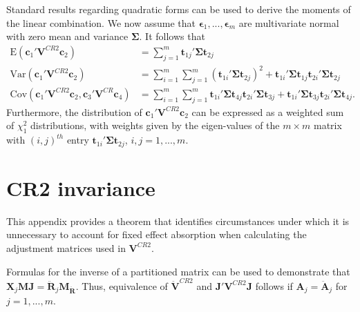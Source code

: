 \documentclass[12pt]{article}\usepackage[]{graphicx}\usepackage[]{color}
\newcommand{\E}{\text{E}}
\newcommand{\Cov}{\text{Cov}}
\newcommand{\Var}{\text{Var}}
\newcommand{\bm}{\mathbf}
\newcommand{\bs}{\boldsymbol}
\begin{document}
Standard results regarding quadratic forms can be used to derive the moments of the linear combination. We now assume that $\bs\epsilon_1,...,\bs\epsilon_m$ are multivariate normal with zero mean and variance $\bs\Sigma$. It follows that 
\begin{align}
\label{eq:CRVE_expectation}
\E\left(\bm{c}_1' \bm{V}^{CR2} \bm{c}_2\right) &= \sum_{j=1}^m \bm{t}_{1j}' \bs\Sigma \bm{t}_{2j} \\
\label{eq:CRVE_variance}
\Var\left(\bm{c}_1' \bm{V}^{CR2} \bm{c}_2\right) &= \sum_{i=1}^m \sum_{j=1}^m \left(\bm{t}_{1i}' \bs\Sigma \bm{t}_{2j}\right)^2 + \bm{t}_{1i}' \bs\Sigma \bm{t}_{1j} \bm{t}_{2i}' \bs\Sigma \bm{t}_{2j} \\
\label{eq:CRVE_covariance}
\Cov\left(\bm{c}_1' \bm{V}^{CR2} \bm{c}_2, \bm{c}_3' \bm{V}^{CR} \bm{c}_4\right) &= \sum_{i=1}^m \sum_{j=1}^m \bm{t}_{1i}' \bs\Sigma \bm{t}_{4j} \bm{t}_{2i}' \bs\Sigma \bm{t}_{3j} + \bm{t}_{1i}' \bs\Sigma \bm{t}_{3j} \bm{t}_{2i}' \bs\Sigma \bm{t}_{4j}.
\end{align}
Furthermore, the distribution of $\bm{c}_1' \bm{V}^{CR2} \bm{c}_2$ can be expressed as a weighted sum of $\chi^2_1$ distributions, with weights given by the eigen-values of the $m \times m$ matrix with $\left(i,j\right)^{th}$ entry $\bm{t}_{1i}' \bs\Sigma \bm{t}_{2j}$, $i,j=1,...,m$.


\section{CR2 invariance}
\label{app:theorem1}

This appendix provides a theorem that identifies circumstances under which it is unnecessary to account for fixed effect absorption when calculating the adjustment matrices used in $\bm{V}^{CR2}$. 

Formulas for the inverse of a partitioned matrix can be used to demonstrate that $\bm{X}_j\bm{M}\bm{J} = \bm{\ddot{R}}_j \bm{M_{\ddot{R}}}$. Thus, equivalence of $\bm{\ddot{V}}^{CR2}$ and $\bm{J}'\bm{V}^{CR2}\bm{J}$ follows if $\bm{A}_j = \bm{\ddot{A}}_j$ for $j = 1,...,m$.
\end{document}
